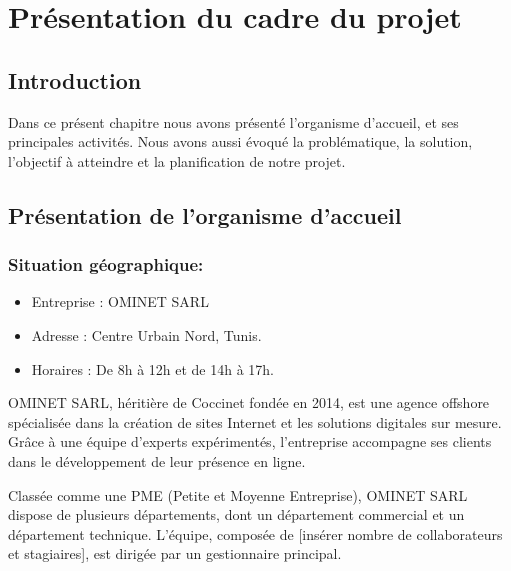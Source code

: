 \chapter{Présentation du cadre du projet} 


\section*{Introduction} %
Dans ce présent chapitre nous avons présenté l’organisme d’accueil, et ses principales activités. Nous avons aussi évoqué la problématique, la solution, l’objectif à atteindre et la planification de notre projet.
\renewcommand{\thesection}{\Roman{section}.} %
\renewcommand{\thesubsection}{\arabic{subsection}.} %
\renewcommand{\thesubsubsection}{\thesubsection\arabic{subsubsection}} %

\setcounter{secnumdepth}{3} 
\section{Présentation de l'organisme d'accueil}
\subsection{Situation géographique:}
\begin{itemize}
    \item Entreprise : OMINET SARL 
    \item Adresse : Centre Urbain Nord, Tunis. 
    \item Horaires : De 8h à 12h et de 14h à 17h.
\end{itemize}

OMINET SARL, héritière de Coccinet fondée en 2014, est une agence offshore spécialisée dans la création de sites Internet et les solutions digitales sur mesure. Grâce à une équipe d'experts expérimentés, l’entreprise accompagne ses clients dans le développement de leur présence en ligne.

Classée comme une PME (Petite et Moyenne Entreprise), OMINET SARL dispose de plusieurs départements, dont un département commercial et un département technique. L'équipe, composée de [insérer nombre de collaborateurs et stagiaires], est dirigée par un gestionnaire principal.


